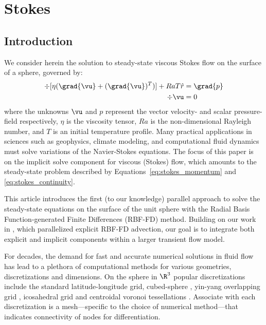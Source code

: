 
\chapter{Stokes}

\section{Introduction}

We consider herein the solution to steady-state viscous Stokes flow on the surface of a sphere, governed by: 
  \begin{align}
\div{[\eta(\grad{\vu} + (\grad{\vu})^T)]} + Ra T \hat{r} & = \grad{p} \label{eq:stokes_momentum} \\
\div{\vu} & = 0 \label{eq:stokes_continuity} 
\end{align}
where the unknowns $\vu$ and $p$ represent the vector velocity- and scalar pressure-field respectively, $\eta$ is the viscosity tensor, $Ra$ is the non-dimensional Rayleigh number, and $T$ is an initial temperature profile. Many practical applications in sciences such as geophysics, climate modeling, and computational fluid dynamics must solve variations of the Navier-Stokes equations. The focus of this paper is on the implicit solve component for viscous (Stokes) flow, which amounts to the steady-state problem described by Equations~\ref{eq:stokes_momentum} and \ref{eq:stokes_continuity}. 

This article introduces the first (to our knowledge) parallel approach to solve the steady-state equations on the surface of the unit sphere with the Radial Basis Function-generated Finite Differences (RBF-FD) method. Building on our work in \cite{bolligFlyerErlebacher2011}, which parallelized explicit RBF-FD advection, our goal is to integrate both explicit and implicit components within a larger transient flow model. 





For decades, the demand for fast and accurate numerical solutions in fluid flow has lead to a plethora of computational methods for various geometries, discretizations and dimensions.  On the sphere in $\R^3$ popular discretizations include the standard latitude-longitude grid, cubed-sphere \cite{NairTransport05}, yin-yang overlapping grid \cite{Kameyama2008a}, icosahedral grid \cite{Randall2002} and centroidal voronoi tessellations \cite{Du2006}. Associate with each discretization is a mesh---specific to the choice of numerical method---that indicates connectivity of nodes for differentiation.

